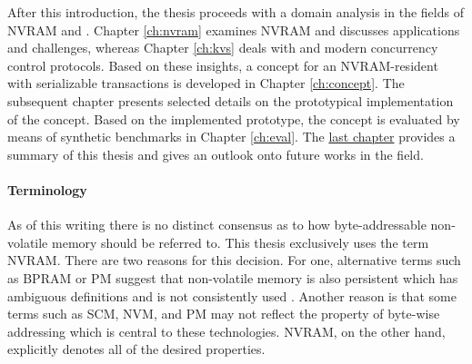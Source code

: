 After this introduction, the thesis proceeds with a domain analysis in the
fields of \ac{NVRAM} and \kvsp. Chapter \ref{ch:nvram} examines \ac{NVRAM} and
discusses applications and challenges, whereas Chapter \ref{ch:kvs} deals with
\kvsp and modern concurrency control protocols. Based on these insights, a
concept for an NVRAM-resident \kvs with serializable transactions is developed
in Chapter \ref{ch:concept}. The subsequent chapter presents selected details on
the prototypical implementation of the concept. Based on the implemented
prototype, the concept is evaluated by means of synthetic benchmarks in Chapter
\ref{ch:eval}. The \hyperref[ch:summary]{last chapter} provides a summary of
this thesis and gives an outlook onto future works in the field.

\paragraph{Terminology}

As of this writing there is no distinct consensus as to how byte-addressable
non-volatile memory should be referred to. This thesis exclusively uses the term
\ac{NVRAM}. There are two reasons for this decision. For one, alternative terms
such as \ac{BPRAM} or \ac{PM} suggest that non-volatile memory is also
persistent which has ambiguous definitions and is not consistently used
\cite{volos2017whisper}. Another reason is that some terms such as \ac{SCM},
\ac{NVM}, and \ac{PM} may not reflect the property of byte-wise addressing which
is central to these technologies. \ac{NVRAM}, on the other hand, explicitly
denotes all of the desired properties.
